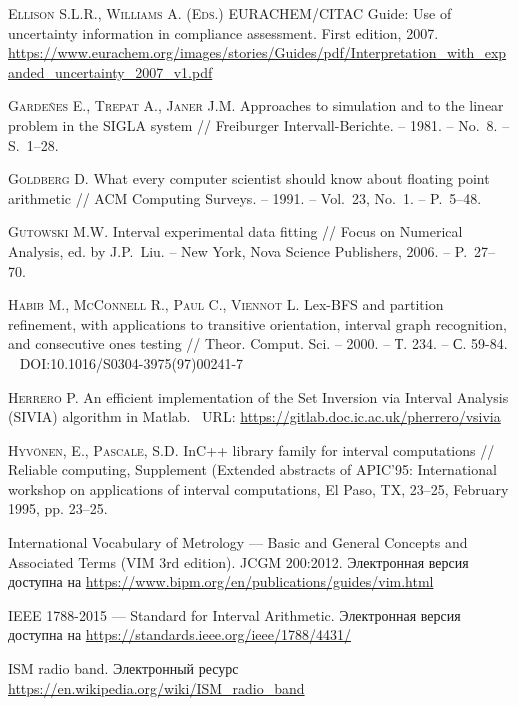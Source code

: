 \documentclass[a5paper,openany]{book}
\newcommand{\electronicbook}{}%
\newcommand{\doi}[1]{
    \ifdefined\electronicbook
        DOI:#1
    \fi}%
\begin{document}
\begin{thebibliography}{999}
\textsc{Ellison S.L.R., Williams A. (Eds.)} EURACHEM/CITAC Guide: Use of uncertainty 
information in compliance assessment. First edition, 2007. \\ 
\url{https://www.eurachem.org/images/stories/Guides/pdf/Interpretation_with_expanded_uncertainty_2007_v1.pdf} 

\textsc{Garde\~{n}es E., Trepat A., Janer J.M.} Approaches to simulation and to the linear 
problem in the SIGLA system // Freiburger Intervall-Berichte. -- 1981. -- No.~8. 
-- S.~1--28. 
  
\textsc{Goldberg D.} What every computer scientist should know about floating point 
arithmetic // ACM Computing Surveys. -- 1991. -- Vol.~23, No.~1. -- P.~5--48. 
    
\textsc{Gutowski M.W.} Interval experimental data fitting // Focus on Numerical Analysis, 
ed. by J.P.~Liu. -- New York, Nova Science Publishers, 2006. -- P.~27--70. 

\textsc{Habib M., McConnell R., Paul C., Viennot L.} Lex-BFS and partition refinement, 
with applications to transitive orientation, interval graph recognition, and consecutive 
ones testing // Theor. Comput. Sci. -- 2000. -- Т. 234. -- С. 59-84.  \  
\doi{10.1016/S0304-3975(97)00241-7} 
  
\textsc{Herrero P.} An efficient implementation of the Set Inversion 
via Interval Analysis (SIVIA) algorithm in Matlab. \ 
URL: \url{https://gitlab.doc.ic.ac.uk/pherrero/vsivia}
      
\textsc{Hyvönen, E., Pascale, S.D.} InC++ library family for interval computations // 
Reliable computing, Supplement (Extended abstracts of APIC’95: International workshop 
on applications of interval computations, El Paso, TX, 23–25, February 1995, pp. 23–25.  
      
\bibitem{MetrolVocabOrig} 
International Vocabulary of Metrology --- Basic and General Concepts and Associated 
Terms (VIM 3rd edition). JCGM 200:2012. Электронная версия доступна на  
\url{https://www.bipm.org/en/publications/guides/vim.html}
  
IEEE 1788-2015 --- Standard for Interval Arithmetic.  
Электронная версия доступна на \url{https://standards.ieee.org/ieee/1788/4431/} 
  
\bibitem{ISM} 
ISM radio band. Электронный ресурс  \url{https://en.wikipedia.org/wiki/ISM_radio_band} 
  

\end{thebibliography}
\end{document}
